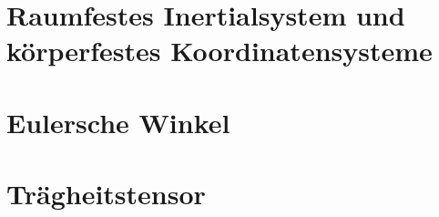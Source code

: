 \section{Raumfestes Inertialsystem und körperfestes Koordinatensysteme}

\section{Eulersche Winkel}

\section{Trägheitstensor}